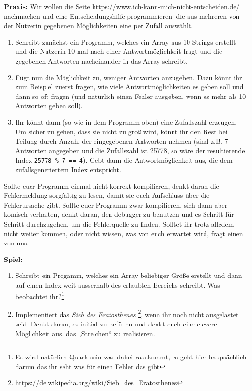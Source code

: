 \textbf{Praxis:}
Wir wollen die Seite \url{https://www.ich-kann-mich-nicht-entscheiden.de/}
nachmachen und eine Entscheidungshilfe programmieren, die aus mehreren von der
Nutzerin gegebenen Möglichkeiten eine per Zufall auswählt.

\begin{enumerate}
    \item Schreibt zunächst ein Programm, welches ein Array aus 10 Strings
        erstellt und die Nutzerin 10 mal nach einer Antwortmöglichkeit fragt
        und die gegebenen Antworten nacheinander in das Array schreibt.
    \item Fügt nun die Möglichkeit zu, weniger Antworten anzugeben. Dazu könnt
        ihr zum Beispiel zuerst fragen, wie viele Antwortmöglichkeiten es geben
        soll und dann so oft fragen (und natürlich einen Fehler ausgeben, wenn
        es mehr als 10 Antworten geben soll).
    \item Ihr könnt dann (so wie in dem Programm oben) eine Zufallszahl
        erzeugen. Um sicher zu gehen, dass sie nicht zu groß wird, könnt ihr
        den Rest bei Teilung durch Anzahl der eingegebenen Antworten nehmen
        (sind z.B. 7 Antworten angegeben und die Zufallszahl ist 25778, so wäre
        der resultierende Index \texttt{25778 \% 7 == 4}). Gebt dann die
        Antwortmöglichkeit aus, die dem zufallsgeneriertem Index
        entspricht.
\end{enumerate}

Sollte euer Programm einmal nicht korrekt kompilieren, denkt daran die
Fehlermeldung sorgfältig zu lesen, damit sie euch Aufschluss über die
Fehlerursache gibt. Sollte euer Programm zwar kompilieren, sich dann aber
komisch verhalten, denkt daran, den debugger zu benutzen und es Schritt für
Schritt durchzugehen, um die Fehlerquelle zu finden. Solltet ihr trotz alledem
nicht weiter kommen, oder nicht wissen, was von euch erwartet wird, fragt einen
von uns.

\textbf{Spiel:}
\begin{enumerate}
    \item Schreibt ein Progamm, welches ein Array beliebiger Größe erstellt und
        dann auf einen Index weit ausserhalb des erlaubten Bereichs schreibt.
        Was beobachtet ihr?\footnote{Es wird natürlich Quark sein was dabei
                rauskommt, es geht hier haupsächlich darum das ihr seht was für
                einen Fehler das gibt}
    \item Implementiert das \emph{Sieb des Eratosthenes}
        \footnote{\url{https://de.wikipedia.org/wiki/Sieb_des_Eratosthenes}},
        wenn ihr noch nicht ausgelastet seid.
        Denkt daran, es initial zu befüllen und denkt euch eine clevere
        Möglichkeit aus, das „Streichen“ zu realisieren.
\end{enumerate}


